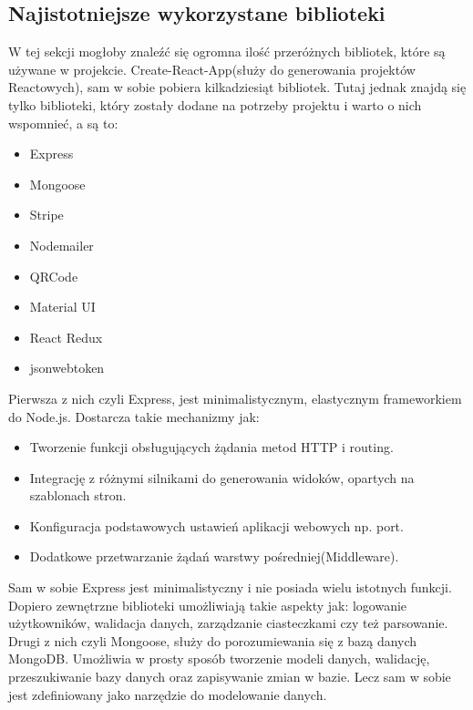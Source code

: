 \documentclass[12pt]{article}
\begin{document}
\begin{sloppypar}
{  \subsection{Najistotniejsze wykorzystane biblioteki}
  \label{section:most-important-libraries}
  {
    W tej sekcji mogłoby znaleźć się ogromna ilość przeróżnych bibliotek, które są używane w projekcie. Create-React-App(służy do generowania projektów Reactowych), 
    sam w sobie pobiera kilkadziesiąt bibliotek. Tutaj jednak znajdą się tylko biblioteki, który zostały dodane na potrzeby projektu i warto o nich wspomnieć, a są to:
    \begin{itemize}
      \item Express
      \item Mongoose
      \item Stripe
      \item Nodemailer
      \item QRCode
      \item Material UI
      \item React Redux
      \item jsonwebtoken
    \end{itemize}
    Pierwsza z nich czyli Express, jest minimalistycznym, elastycznym frameworkiem do Node.js. Dostarcza takie mechanizmy jak\cite{express}:
    \begin{itemize}
      \item Tworzenie funkcji obsługujących żądania metod HTTP i routing.
      \item Integrację z różnymi silnikami do generowania widoków, opartych na szablonach stron.
      \item Konfiguracja podstawowych ustawień aplikacji webowych np. port.
      \item Dodatkowe przetwarzanie żądań warstwy pośredniej(Middleware).
    \end{itemize}
    Sam w sobie Express jest minimalistyczny i nie posiada wielu istotnych funkcji. Dopiero zewnętrzne biblioteki umożliwiają takie aspekty jak: logowanie użytkowników,
    walidacja danych, zarządzanie ciasteczkami czy też parsowanie.\\
 
    Drugi z nich czyli Mongoose, służy do porozumiewania się z bazą danych MongoDB. Umożliwia w prosty sposób tworzenie modeli danych, walidację, przeszukiwanie bazy danych 
    oraz zapisywanie zmian w bazie. Lecz sam w sobie jest zdefiniowany jako narzędzie do modelowanie danych.\\
 
}}
\end{sloppypar}
\end{document}
